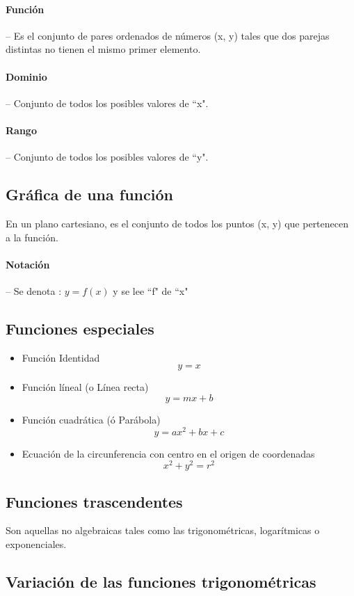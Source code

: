 \documentclass[12pt, a5paper]{article}
\begin{document}
	\paragraph{Función} -- Es el conjunto de pares ordenados de números (x, y) tales que dos parejas distintas no tienen el mismo primer elemento.
	
	\paragraph{Dominio} -- Conjunto de todos los posibles valores de ``x".
	
	\paragraph{Rango} -- Conjunto de todos los posibles valores de ``y".
	
	\subsection*{Gráfica de una función}
	En un plano cartesiano, es el conjunto de todos los puntos (x, y) que pertenecen a la función.
	
	\paragraph{Notación} -- Se denota : $y = f(x)$
	y se lee ``f" de ``x" %
	\subsection*{Funciones especiales}
	\begin{itemize}
		\item{Función Identidad
			$$y = x$$
		}
		\item{Función líneal (o Línea recta)
			$$y = mx + b$$
		}
		\item{Función cuadrática (ó Parábola)
			$$y = ax^{2} + bx + c$$
		}
		\item{Ecuación de la circunferencia con centro en el origen de coordenadas
			$$x^{2} + y^{2} = r^{2}$$
		}
	\end{itemize}
	
	\subsection*{Funciones trascendentes}
	Son aquellas no algebraicas tales como las trigonométricas, logarítmicas o exponenciales.
	
	\subsection*{Variación de las funciones trigonométricas}
\end{document}
